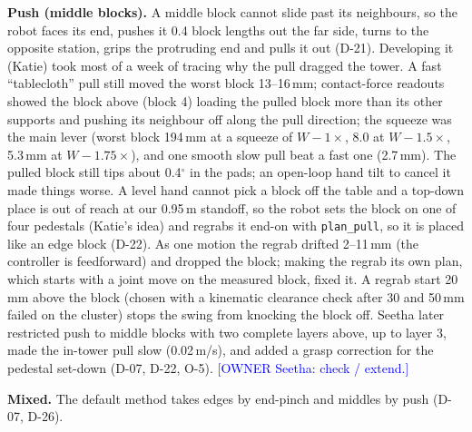 \documentclass[conference]{IEEEtran}
\newcommand{\owner}[2]{\textcolor{blue}{[OWNER #1: #2]}}
\begin{document}
\textbf{Push (middle blocks).} A middle block cannot slide past its neighbours, so the robot faces its end, pushes it
0.4 block lengths out the far side, turns to the opposite station, grips the protruding end and pulls it out (D-21).
Developing it (Katie) took most of a week of tracing why the pull dragged the tower. A fast ``tablecloth'' pull still
moved the worst block 13--16\,mm; contact-force readouts showed the block above (block 4) loading the pulled block
more than its other supports and pushing its neighbour off along the pull direction; the squeeze was the main lever
(worst block 194\,mm at a squeeze of $W-1\times$, 8.0 at $W-1.5\times$, 5.3\,mm at $W-1.75\times$), and one smooth slow pull
beat a fast one (2.7\,mm). The pulled block still tips about 0.4$^\circ$ in the pads; an open-loop hand tilt to cancel it
made things worse. A level hand cannot pick a block off the table and a top-down place is out of reach at our
0.95\,m standoff, so the robot sets the block on one of four pedestals (Katie's idea) and regrabs it end-on with
\texttt{plan\_pull}, so it is placed like an edge block (D-22). As one motion the regrab drifted 2--11\,mm (the
controller is feedforward) and dropped the block; making the regrab its own plan, which starts with a joint move on the
measured block, fixed it. A regrab start 20\,mm above the block (chosen with a kinematic clearance check after 30 and
50\,mm failed on the cluster) stops the swing from knocking the block off. Seetha later restricted push to middle
blocks with two complete layers above, up to layer 3, made the in-tower pull slow (0.02\,m/s), and added a grasp
correction for the pedestal set-down (D-07, D-22, O-5). \owner{Seetha}{check / extend.}

\textbf{Mixed.} The default method takes edges by end-pinch and middles by push (D-07, D-26).
\end{document}

